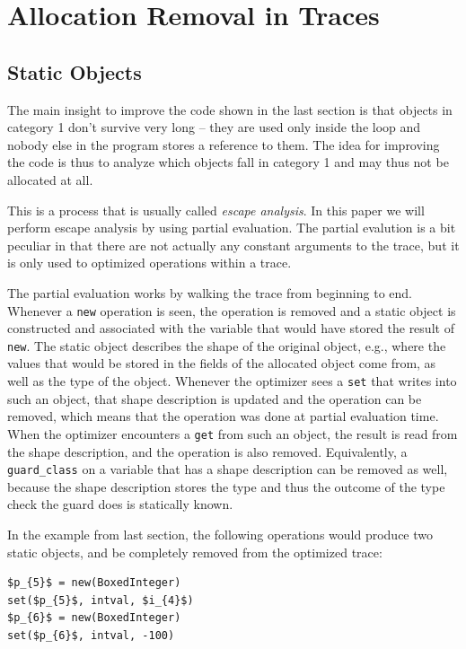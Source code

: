 \documentclass{sigplanconf}
\newcommand\eg{e.g.,\xspace}
\begin{document}
\section{Allocation Removal in Traces}
\label{sec:statics}

\subsection{Static Objects}

The main insight to improve the code shown in the last section is that objects
in category 1 don't survive very long -- they are used only inside the loop and
nobody else in the program stores a reference to them. The idea for improving
the code is thus to analyze which objects fall in category 1 and may thus
not be allocated at all.

This is a process that is usually called \emph{escape analysis}. In this paper we will
perform escape analysis by using partial evaluation. The partial evalution is a
bit peculiar in that there are not actually any constant arguments to the trace,
but it is only used to optimized operations within a trace.

The partial evaluation works by walking the trace from beginning to end.
Whenever a \lstinline{new} operation is seen, the operation is removed and a static
object is constructed and associated with the variable that would have stored
the result of \lstinline{new}. The static object describes the shape of the
original object, \eg where the values that would be stored in the fields of the
allocated object come from, as well as the type of the object. Whenever the
optimizer sees a \lstinline{set} that writes into such an object, that shape
description is updated and the operation can be removed, which means that the
operation was done at partial evaluation time. When the optimizer encounters a
\lstinline{get} from such an object, the result is read from the shape
description, and the operation is also removed. Equivalently, a
\lstinline{guard_class} on a variable that has a shape description can be removed
as well, because the shape description stores the type and thus the outcome of
the type check the guard does is statically known.

In the example from last section, the following operations would produce two
static objects, and be completely removed from the optimized trace:

\begin{lstlisting}[mathescape,xleftmargin=20pt]
$p_{5}$ = new(BoxedInteger)
set($p_{5}$, intval, $i_{4}$)
$p_{6}$ = new(BoxedInteger)
set($p_{6}$, intval, -100)
\end{lstlisting}
\end{document}
